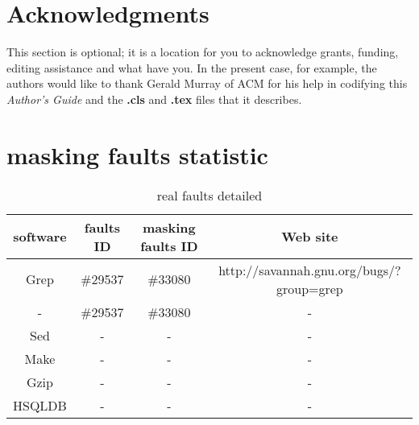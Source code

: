 \documentclass{sig-alternate}
\begin{document}
\section{Acknowledgments}
This section is optional; it is a location for you
to acknowledge grants, funding, editing assistance and
what have you.  In the present case, for example, the
authors would like to thank Gerald Murray of ACM for
his help in codifying this \textit{Author's Guide}
and the \textbf{.cls} and \textbf{.tex} files that it describes.

%

%
%
\appendix
\section{masking faults statistic}
\begin{table*}\renewcommand{\arraystretch}{1.3}
\caption{real faults detailed}
\label{masking effect detail}
\begin{tabular}{c|c|c|c} \hline
software & faults ID & masking faults ID & Web site\\ \hline
Grep & \#29537 &  \#33080  & http://savannah.gnu.org/bugs/?group=grep\\ \hline
- & \#29537 &  \#33080  & -\\ \hline
Sed & - & -  & - \\ \hline
Make & - &  - &-\\ \hline
Gzip &- &  - &-\\ \hline
HSQLDB &- & - &-\\
\hline\end{tabular}
\end{table*}
\end{document}
